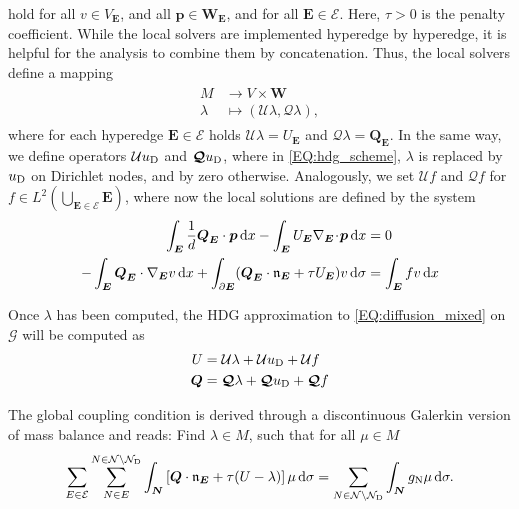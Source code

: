 \documentclass[a4paper, english, 12pt, reqno, draft]{amsart}
\theoremstyle{definition}
\theoremstyle{remark}
\numberwithin{equation}{section}
\newcommand{\setEdge}{\ensuremath{\mathcal E}}
\newcommand{\setNode}{\ensuremath{\mathcal N}}
\newcommand{\setNodeDir}{\ensuremath{\setNode_\textup D}}
\newcommand{\edge}{\ensuremath{E}}
\newcommand{\node}{\ensuremath{N}}
\newcommand{\Graph}{\ensuremath{\boldsymbol{\mathcal G}}}
\newcommand{\SetEdge}{\ensuremath{\boldsymbol{\mathcal E}}}
\newcommand{\Edge}{{\ensuremath{\boldsymbol E}}}
\newcommand{\Node}{{\ensuremath{\boldsymbol N}}}
\newcommand{\Nabla}{\ensuremath{\nabla_\Edge}}
\newcommand{\Div}{\ensuremath{\Nabla\!\cdot\!}}
\newcommand{\Normal}{\ensuremath{\mathfrak n_\Edge}}
\newcommand{\skeletalSpace}{\ensuremath{M}}
\newcommand{\discElementSpace}{\ensuremath{V}}
\renewcommand{\vec}[1]{\ensuremath{\boldsymbol{#1}}}
\newcommand{\dx}{\ensuremath{\, \textup d x}}
\newcommand{\ds}{\ensuremath{\, \textup d \sigma}}
\newcommand{\localU}{\ensuremath{\mathcal U}}
\newcommand{\localQ}{\ensuremath{\vec{\mathcal Q}}}
\begin{document}
% 
hold for all $v \in V_\Edge$, and all $\vec p \in \vec W_\Edge$, and for all $\Edge \in \SetEdge$. Here, $\tau > 0$ is the penalty coefficient. While the local solvers are implemented hyperedge by hyperedge, it is helpful for the analysis to combine them by concatenation. Thus, the local solvers define a mapping
% 
\begin{gather}
 \begin{split}
  \skeletalSpace & \to \discElementSpace \times \vec W\\
  \lambda &\mapsto (\localU \lambda, \localQ \lambda),
 \end{split}
\end{gather}
% 
where for each hyperedge $\Edge \in \SetEdge$ holds $\localU \lambda = U_\Edge$ and $\localQ \lambda = \vec Q_\Edge$. In the same way, we define operators $\localU u_\textup D$ and $ \localQ u_\textup D$, where in \eqref{EQ:hdg_scheme}, $\lambda$ is replaced by $u_\textup D$ on Dirichlet nodes, and by zero otherwise. Analogously, we set  $\localU f$ and $ \localQ f$ for
$f\in L^2(\bigcup_{\Edge \in \SetEdge} \Edge)$, where now the local solutions are defined by the system
% 
\begin{subequations}\label{EQ:hdg_f}
 \begin{align}
  \int_\Edge \frac{1}{d} \vec Q_\Edge \cdot \vec p \dx - \int_\Edge U_\Edge \Div \vec p \dx & = 0 \label{EQ:hdg_f_primary}\\
  - \int_\Edge \vec Q_\Edge \cdot \Nabla v \dx  + \int_{\partial \Edge} ( \vec Q_\Edge \cdot \Normal + \tau U_\Edge ) v \ds & =  \int_{\Edge} f v \dx\label{EQ:hdg_f_flux}
 \end{align}
\end{subequations}

Once $\lambda$ has been computed, the HDG approximation
to \eqref{EQ:diffusion_mixed} on $\Graph$ will be computed as
% 
\begin{gather}\label{EQ:construct_unk}
  \begin{split}
    U &= \localU \lambda + \localU u_\textup D + \localU f\\
    \vec Q &= \localQ \lambda + \localQ u_\textup D + \localQ f
  \end{split}
\end{gather}

The global coupling condition is derived through a discontinuous
Galerkin version of mass balance and reads: Find
$\lambda \in \skeletalSpace$, such that for all
$ \mu \in \skeletalSpace$
% 
\begin{equation}
 \sum_{\edge \in \setEdge} \sum^{\node \in \setNode \setminus \setNodeDir}_{\node \in \edge} \int_\Node \left[ \vec Q \cdot \Normal + \tau (U - \lambda) \right] \mu \ds = \sum_{\node \in \setNode \setminus \setNodeDir} \int_\Node g_\textup N \mu \ds.\label{EQ:hdg_global}
\end{equation}
% 
\end{document}
